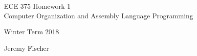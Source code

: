 \documentclass[12pt,letterpaper]{article}
\begin{document}
\begin{titlepage}
    \vspace*{4cm}
    \begin{flushright}
    {\huge
        ECE 375 Homework 1\\[1cm]
    }
    {\large
       Computer Organization and Assembly Language Programming
    }
    \end{flushright}
    \begin{flushleft}
    Winter Term 2018
    \end{flushleft}
    \begin{flushright}
    Jeremy Fischer

    \end{flushright}

\end{titlepage}
\end{document}
